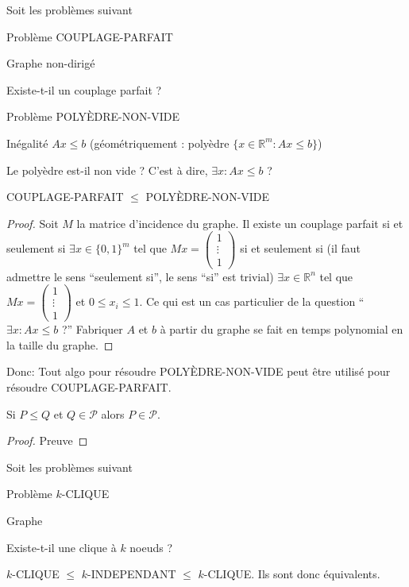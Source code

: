 \begin{myexem}
  Soit les problèmes suivant
  \begin{description}
    \item{Problème} COUPLAGE-PARFAIT
    \item[Instance] Graphe non-dirigé
    \item[Question] Existe-t-il un couplage parfait ?
  \end{description}
  \begin{description}
    \item{Problème} POLYÈDRE-NON-VIDE
    \item[Instance] Inégalité $Ax \leq b$ (géométriquement : polyèdre $\{x \in \mathbb{R}^m : Ax \leq b\}$)
    \item[Question] Le polyèdre est-il non vide ? C'est à dire, $\exists x : Ax \leq b$ ?
  \end{description}
  COUPLAGE-PARFAIT $\leq$ POLYÈDRE-NON-VIDE
  \begin{proof}
    Soit $M$ la matrice d'incidence du graphe.
    Il existe un couplage parfait si et seulement si $\exists x \in \{0,1\}^m$ tel que
    $Mx = \begin{pmatrix}
      1\\
      \vdots\\
      1
    \end{pmatrix}$ si et seulement si (il faut admettre le sens ``seulement si'', le sens ``si'' est trivial)
    $\exists x \in \mathbb{R}^n$ tel que $Mx = \begin{pmatrix}
      1\\
      \vdots\\
      1
    \end{pmatrix}$ et $0 \leq x_i \leq 1$.
    Ce qui est un cas particulier de la question
    ``$\exists x : Ax \leq b$ ?''
    Fabriquer $A$ et $b$ à partir du graphe se fait en temps polynomial en la taille du graphe.
  \end{proof}
  Donc: Tout algo pour résoudre POLYÈDRE-NON-VIDE peut être utilisé pour résoudre COUPLAGE-PARFAIT.
\end{myexem}

\begin{mytheo}
  Si $P \leq Q$ et $Q \in \mathcal{P}$ alors $P \in \mathcal{P}$.
  \begin{proof}
     Preuve \addTODO
  \end{proof}
\end{mytheo}

\begin{myexem}
  Soit les problèmes suivant
  \begin{description}
    \item{Problème} $k$-CLIQUE
    \item[Instance] Graphe
    \item[Question] Existe-t-il une clique à $k$ noeuds ?
  \end{description}
  $k$-CLIQUE $\leq$ $k$-INDEPENDANT $\leq$ $k$-CLIQUE.
  Ils sont donc équivalents.
\end{myexem}

